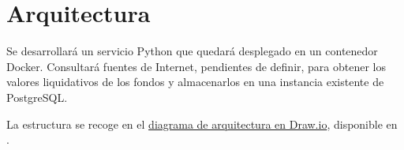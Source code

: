 \chapter{Arquitectura}

Se desarrollará un servicio Python que quedará desplegado en un contenedor
Docker. Consultará fuentes de Internet, pendientes de definir, para obtener
los valores liquidativos de los fondos y almacenarlos en una instancia
existente de PostgreSQL.

La estructura se recoge en el
\href{run:../../design/arquitectura.drawio}{diagrama de arquitectura en Draw.io},
disponible en .
